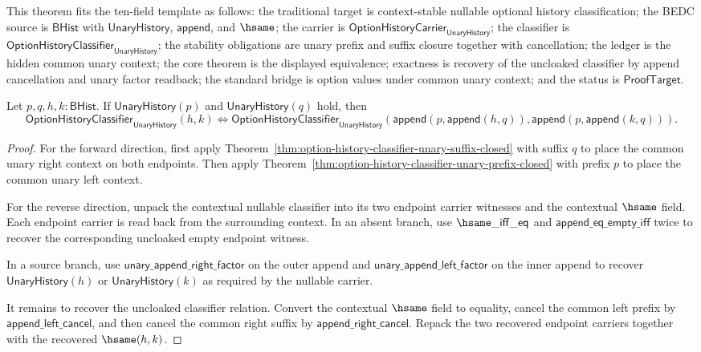 \begin{theorem}
\label{thm:option-history-classifier-unary-two-sided-context}
This theorem fits the ten-field template as follows: the traditional target is
context-stable nullable optional history classification; the BEDC source is
$\mathsf{BHist}$ with $\mathsf{UnaryHistory}$, $\mathsf{append}$, and
$\hsame$; the carrier is
$\mathsf{OptionHistoryCarrier}_{\mathsf{UnaryHistory}}$; the classifier is
$\mathsf{OptionHistoryClassifier}_{\mathsf{UnaryHistory}}$; the stability
obligations are unary prefix and suffix closure together with cancellation;
the ledger is the hidden common unary context; the core theorem is the
displayed equivalence; exactness is recovery of the uncloaked classifier by
append cancellation and unary factor readback; the standard bridge is option
values under common unary context; and the status is $\mathsf{ProofTarget}$.

Let $p,q,h,k:\mathsf{BHist}$. If $\mathsf{UnaryHistory}(p)$ and
$\mathsf{UnaryHistory}(q)$ hold, then
$$
\mathsf{OptionHistoryClassifier}_{\mathsf{UnaryHistory}}(h,k)
\Longleftrightarrow
\mathsf{OptionHistoryClassifier}_{\mathsf{UnaryHistory}}
  (\mathsf{append}(p,\mathsf{append}(h,q)),
   \mathsf{append}(p,\mathsf{append}(k,q))).
$$
\end{theorem}
\begin{proof}
For the forward direction, first apply
Theorem~\ref{thm:option-history-classifier-unary-suffix-closed} with suffix
$q$ to place the common unary right context on both endpoints. Then apply
Theorem~\ref{thm:option-history-classifier-unary-prefix-closed} with prefix
$p$ to place the common unary left context.

For the reverse direction, unpack the contextual nullable classifier into its
two endpoint carrier witnesses and the contextual $\hsame$ field. Each
endpoint carrier is read back from the surrounding context. In an absent
branch, use $\hsame\_\mathsf{iff}\_\mathsf{eq}$ and
$\mathsf{append}\_\mathsf{eq}\_\mathsf{empty}\_\mathsf{iff}$ twice to recover
the corresponding uncloaked empty endpoint witness.

In a source branch, use
$\mathsf{unary}\_\mathsf{append}\_\mathsf{right}\_\mathsf{factor}$ on the
outer append and
$\mathsf{unary}\_\mathsf{append}\_\mathsf{left}\_\mathsf{factor}$ on the inner
append to recover $\mathsf{UnaryHistory}(h)$ or
$\mathsf{UnaryHistory}(k)$ as required by the nullable carrier.

It remains to recover the uncloaked classifier relation. Convert the
contextual $\hsame$ field to equality, cancel the common left prefix by
$\mathsf{append}\_\mathsf{left}\_\mathsf{cancel}$, and then cancel the common
right suffix by $\mathsf{append}\_\mathsf{right}\_\mathsf{cancel}$. Repack the
two recovered endpoint carriers together with the recovered $\hsame(h,k)$.
\end{proof}

